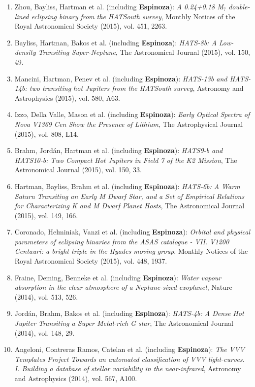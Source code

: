 \documentclass[12pt, a4paper]{article} %
\begin{document}
\begin{flushleft}
\begin{enumerate}
\item Zhou, Bayliss, Hartman et al. (including \textbf{Espinoza}): \textit{A 0.24+0.18 M$_{?}$ double-lined eclipsing binary from the HATSouth survey}, Monthly Notices of the Royal Astronomical Society (2015), vol. 451, 2263.
\item Bayliss, Hartman, Bakos et al. (including \textbf{Espinoza}): \textit{HATS-8b: A Low-density Transiting Super-Neptune}, The Astronomical Journal (2015), vol. 150, 49.
\item Mancini, Hartman, Penev et al. (including \textbf{Espinoza}): \textit{HATS-13b and HATS-14b: two transiting hot Jupiters from the HATSouth survey}, Astronomy and Astrophysics (2015), vol. 580, A63.
\item Izzo, Della Valle, Mason et al. (including \textbf{Espinoza}): \textit{Early Optical Spectra of Nova V1369 Cen Show the Presence of Lithium}, The Astrophysical Journal (2015), vol. 808, L14.
\item Brahm, Jord\'an, Hartman et al. (including \textbf{Espinoza}): \textit{HATS9-b and HATS10-b: Two Compact Hot Jupiters in Field 7 of the K2 Mission}, The Astronomical Journal (2015), vol. 150, 33.
\item Hartman, Bayliss, Brahm et al. (including \textbf{Espinoza}): \textit{HATS-6b: A Warm Saturn Transiting an Early M Dwarf Star, and a Set of Empirical Relations for Characterizing K and M Dwarf Planet Hosts}, The Astronomical Journal (2015), vol. 149, 166.
\item Coronado, Helminiak, Vanzi et al. (including \textbf{Espinoza}): \textit{Orbital and physical parameters of eclipsing binaries from the ASAS catalogue - VII. V1200 Centauri: a bright triple in the Hyades moving group}, Monthly Notices of the Royal Astronomical Society (2015), vol. 448, 1937.
\item Fraine, Deming, Benneke et al. (including \textbf{Espinoza}): \textit{Water vapour absorption in the clear atmosphere of a Neptune-sized exoplanet}, Nature (2014), vol. 513, 526.
\item Jord\'an, Brahm, Bakos et al. (including \textbf{Espinoza}): \textit{HATS-4b: A Dense Hot Jupiter Transiting a Super Metal-rich G star}, The Astronomical Journal (2014), vol. 148, 29.
\item Angeloni, Contreras Ramos, Catelan et al. (including \textbf{Espinoza}): \textit{The VVV Templates Project Towards an automated classification of VVV light-curves. I. Building a database of stellar variability in the near-infrared}, Astronomy and Astrophysics (2014), vol. 567, A100.

\end{enumerate}
\end{flushleft}
\end{document}
